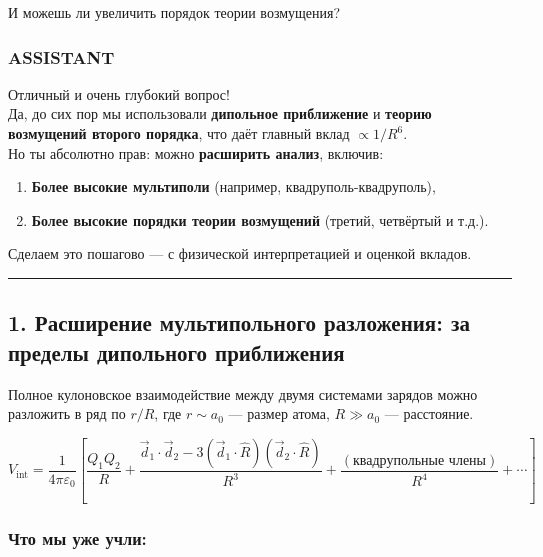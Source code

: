 \documentclass[11pt]{article}
\providecommand{\tightlist}{%
      \setlength{\itemsep}{0pt}\setlength{\parskip}{0pt}}
\begin{document}
И можешь ли увеличить порядок теории возмущения?

\subsubsection{ASSISTANT}\label{assistant-3}

Отличный и очень глубокий вопрос!\\
Да, до сих пор мы использовали \textbf{дипольное приближение} и
\textbf{теорию возмущений второго порядка}, что даёт главный вклад
\(\propto 1/R^6\).\\
Но ты абсолютно прав: можно \textbf{расширить анализ}, включив:

\begin{enumerate}
\def\labelenumi{\arabic{enumi}.}
\tightlist
\item
  \textbf{Более высокие мультиполи} (например, квадруполь-квадруполь),
\item
  \textbf{Более высокие порядки теории возмущений} (третий, четвёртый и
  т.д.).
\end{enumerate}

Сделаем это пошагово --- с физической интерпретацией и оценкой вкладов.

\begin{center}\rule{0.5\linewidth}{\linethickness}\end{center}

\subsection{1. Расширение мультипольного разложения: за пределы
дипольного
приближения}\label{ux440ux430ux441ux448ux438ux440ux435ux43dux438ux435-ux43cux443ux43bux44cux442ux438ux43fux43eux43bux44cux43dux43eux433ux43e-ux440ux430ux437ux43bux43eux436ux435ux43dux438ux44f-ux437ux430-ux43fux440ux435ux434ux435ux43bux44b-ux434ux438ux43fux43eux43bux44cux43dux43eux433ux43e-ux43fux440ux438ux431ux43bux438ux436ux435ux43dux438ux44f}

Полное кулоновское взаимодействие между двумя системами зарядов можно
разложить в ряд по \(r/R\), где \(r \sim a_0\) --- размер атома,
\(R \gg a_0\) --- расстояние.

\[
V_{\text{int}} = \frac{1}{4\pi\varepsilon_0} \left[ \frac{Q_1 Q_2}{R} + \frac{\vec{d}_1 \cdot \vec{d}_2 - 3(\vec{d}_1 \cdot \hat{R})(\vec{d}_2 \cdot \hat{R})}{R^3} + \frac{(\text{квадрупольные члены})}{R^4} + \cdots \right]
\]

\subsubsection{Что мы уже
учли:}\label{ux447ux442ux43e-ux43cux44b-ux443ux436ux435-ux443ux447ux43bux438}
\end{document}

